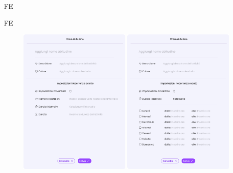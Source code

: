\begin{listaPersonale}{FE}
\begin{listaPersonale2}{FE}
        \begin{center} 
            \begin{figure}[H]
            \centering\includegraphics[width=0.49\textwidth,height=0.35\textheight]{img/FrontEnd/Abitudini/Crea/CreaAbitudine.png}
            \centering\includegraphics[width=0.49\textwidth,height=0.35\textheight]{img/FrontEnd/Abitudini/Crea/CreaAbitudineAvv.png}
            \end{figure}
        \end{center}


\end{listaPersonale2}
\end{listaPersonale}
